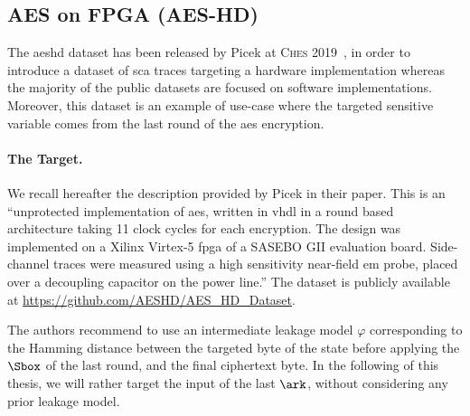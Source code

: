 \subsection{AES on FPGA (AES-HD)}
\label{sec:aeshd}
The \gls{aeshd} dataset has been released by Picek \etal{} at \textsc{Ches} 2019~\cite{picek_curse_2019}, in order to introduce a dataset of \gls{sca} traces targeting a hardware implementation whereas the majority of the public datasets are focused on software implementations.
Moreover, this dataset is an example of use-case where the targeted sensitive variable comes from the last round of the \gls{aes} encryption.

\paragraph{The Target.}
We recall hereafter the description provided by Picek \etal{} in their paper.
This is an ``unprotected implementation of \gls{aes}, written in \gls{vhdl} in a round based architecture taking 11 clock cycles for each encryption.
The design was implemented on a \textsf{Xilinx Virtex-5} \gls{fpga} of a \textsf{SASEBO GII} evaluation board. 
Side-channel traces were measured using a high sensitivity near-field \gls{em} probe,
placed over a decoupling capacitor on the power line.''
The dataset is publicly available at \url{https://github.com/AESHD/AES_HD_Dataset}.

The authors recommend to use an intermediate leakage model \(\varphi\) corresponding to the Hamming distance between the targeted byte of the state before applying the \(\Sbox\) of the last round, and the final ciphertext byte.
In the following of this thesis, we will rather target the input of the last \(\ark\), without considering any prior leakage model.

